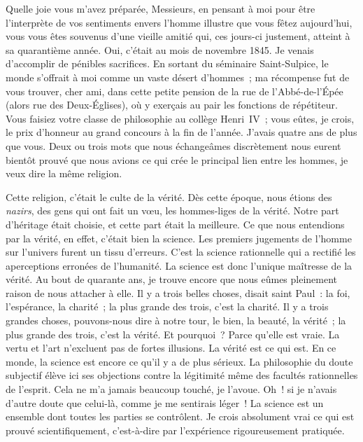 \documentclass[french,twoside]{book} %
\newcommand\orgName[1]{#1}
\newcommand\persName[1]{#1}
\newcommand\placeName[1]{#1}
\newcommand{\dateline}[1]{\medskip{\RaggedLeft{#1}\par}\bigskip}
\begin{document}
\dateline{26 novembre 1885}
\noindent Quelle joie vous m’avez préparée, Messieurs, en pensant à moi pour être l’interprète de vos sentiments envers l’homme illustre que vous fêtez aujourd’hui, vous vous êtes souvenus d’une vieille amitié qui, ces jours-ci justement, atteint à sa quarantième année. Oui, c’était au mois de novembre 1845. Je venais d’accomplir de pénibles sacrifices. En sortant du séminaire {\placeName Saint-Sulpice}, le monde s’offrait à moi comme un vaste désert d’hommes ; ma récompense fut de vous trouver, cher ami, dans cette petite pension de la {\placeName rue de l’Abbé-de-l’Épée} (alors {\placeName rue des Deux-Églises}), où y exerçais au pair les fonctions de répétiteur. Vous faisiez votre classe de philosophie au {\orgName collège Henri IV} ; vous eûtes, je crois, le prix d’honneur au grand concours à la fin de l’année. J’avais quatre ans de plus que vous. Deux ou trois mots que nous échangeâmes discrètement nous eurent bientôt prouvé que nous avions ce qui crée le principal lien entre les hommes, je veux dire la même religion.\par
Cette religion, c’était le culte de la vérité. Dès cette époque, nous étions des {\itshape nazirs}, des gens qui ont fait un vœu, les hommes-liges de la vérité. Notre part d’héritage était choisie, et cette part était la meilleure. Ce que nous entendions par la vérité, en effet, c’était bien la science. Les premiers jugements de l’homme sur l’univers furent un tissu d’erreurs. C’est la science rationnelle qui a rectifié les aperceptions erronées de l’humanité. La science est donc l’unique maîtresse de la vérité. Au bout de quarante ans, je trouve encore que nous eûmes pleinement raison de nous attacher à elle. Il y a trois belles choses, disait {\persName saint Paul} : la foi, l’espérance, la charité ; la plus grande des trois, c’est la charité. Il y a trois grandes choses, pouvons-nous dire à notre tour, le bien, la beauté, la vérité ; la plus grande des trois, c’est la vérité. Et pourquoi ? Parce qu’elle est vraie. La vertu et l’art n’excluent pas de fortes illusions. La vérité est ce qui est. En ce monde, la science est encore ce qu’il y a de plus sérieux. La philosophie du doute subjectif élève ici ses objections contre la légitimité même des facultés rationnelles de l’esprit. Cela ne m’a jamais beaucoup touché, je l’avoue. Oh ! si je n’avais d’autre doute que celui-là, comme je me sentirais léger ! La science est un ensemble dont toutes les parties se contrôlent. Je crois absolument vrai ce qui est prouvé scientifiquement, c’est-à-dire par l’expérience rigoureusement pratiquée.\par
\end{document}
